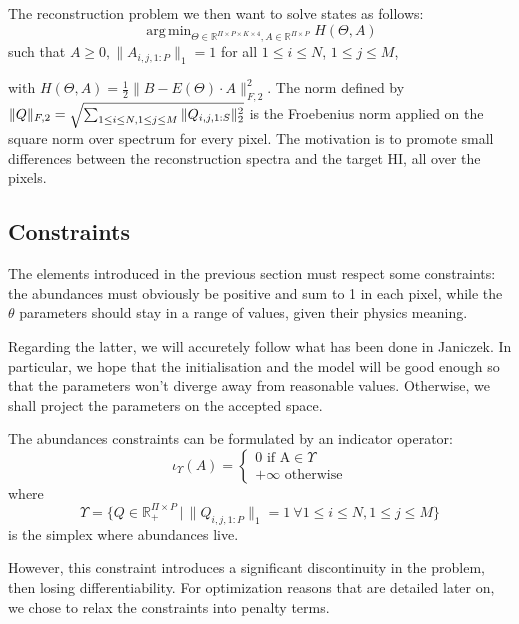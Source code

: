 \documentclass[conference]{IEEEtran}
\DeclareMathOperator*{\argmin}{arg\,min}
\begin{document}
The reconstruction problem we then want to solve states as follows:
\begin{equation}
  \label{eq:reconstruction}
  \argmin_{\Theta \in \mathbb{R}^{\Pi \times P \times K \times 4}, A \in \mathbb{R}^{\Pi \times P}} H(\Theta, A)
\end{equation}
such that $A \geq 0, \|A_{i, j, 1:P}\|_1 = 1$ for all $1\leq i \leq N$, $1\leq j \leq M$, 

with $H(\Theta, A) = \frac{1}{2} \|B - E(\Theta) \cdot A\|_{F, 2}^2$. The norm defined by $\|Q\|_{F, 2} = \sqrt{\sum_{1 \leq i \leq N,\\1 \leq j \leq M} \|Q_{i, j, 1:S}\|_2^2}$ is the Froebenius norm applied on the square norm over spectrum for every pixel. The motivation is to promote small differences between the reconstruction spectra and the target HI, all over the pixels.

\subsection{Constraints}
The elements introduced in the previous section must respect some constraints: the abundances must obviously be positive and sum to 1 in each pixel, while the $\theta$ parameters should stay in a range of values, given their physics meaning.

Regarding the latter, we will accuretely follow what has been done in Janiczek. In particular, we hope that the initialisation and the model will be good enough so that the parameters won't diverge away from reasonable values. Otherwise, we shall project the parameters on the accepted space.

The abundances constraints can be formulated by an indicator operator:
$$\iota_\Upsilon (A) = \begin{cases} 0 \text{ if A}\in \Upsilon\\ +\infty \text{ otherwise} \end{cases}$$
where
$$\Upsilon = \{Q \in \mathbb{R}^{\Pi \times P}_+\, |\,\| Q_{i, j, 1:P} \|_1 = 1 \ \forall 1 \leq i \leq N, 1 \leq j \leq M\}$$
is the simplex where abundances live.

However, this constraint introduces a significant discontinuity in the problem, then losing differentiability. For optimization reasons that are detailed later on, we chose to relax the constraints into penalty terms.
\end{document}
